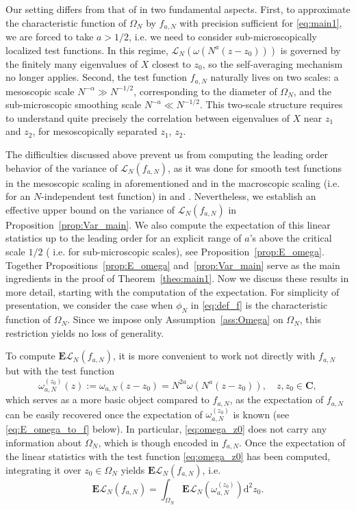 \documentclass[10pt]{amsart}
\numberwithin{equation}{section}
\newcommand{\dif}{\mathrm{d}}
\newcommand{\E}{\mathbf{E}}
\newcommand{\C}{\mathbf{C}}
\newcommand{\Lin}{\mathcal{L}}
\begin{document}
Our setting differs from that of \cite{Cipolloni_meso} in two fundamental aspects. First, to approximate the characteristic function of $\Omega_N$ by $f_{a,N}$ with precision sufficient for \eqref{eq:main1}, we are forced to take $a>1/2$, i.e. we need to consider sub-microscopically localized test functions. In this regime, $\Lin_N(\omega(N^a(z-z_0)))$ is governed by the finitely many eigenvalues of $X$ closest to $z_0$, so the self-averaging mechanism no longer applies. Second, the test function $f_{a,N}$ naturally lives on two scales: a mesoscopic scale $N^{-\alpha}\gg N^{-1/2}$, corresponding to the diameter of $\Omega_N$, and the sub-microscopic smoothing scale $N^{-a}\ll N^{-1/2}$. This two-scale structure requires to understand quite precisely the correlation between eigenvalues of $X$ near $z_1$ and $z_2$, for mesoscopically separated $z_1$, $z_2$.

The difficulties discussed above prevent us from computing the leading order behavior of the variance of $\Lin_N(f_{a,N})$, as it was done for smooth test functions in the mesoscopic scaling in aforementioned \cite[Theorem~2.1]{Cipolloni_meso} and in the macroscopic scaling (i.e. for an $N$-independent test function) in \cite[Theorem~2.2]{macroCLT_complex} and \cite[Theorem~2.2]{macroCLT_real}. Nevertheless, we establish an effective upper bound on the variance of $\Lin_N(f_{a,N})$ in Proposition~\ref{prop:Var_main}. We also compute the expectation of this linear statistics up to the leading order for an explicit range of $a$'s above the critical scale $1/2$ ( i.e. for sub-microscopic scales), see Proposition~\ref{prop:E_omega}. Together Propositions~\ref{prop:E_omega} and~\ref{prop:Var_main} serve as the main ingredients in the proof of Theorem~\ref{theo:main1}. Now we discuss these results in more detail, starting with the computation of the expectation. For simplicity of presentation, we consider the case when $\phi_N$ in \eqref{eq:def_f} is the characteristic function of $\Omega_N$. Since we impose only Assumption~\ref{ass:Omega} on $\Omega_N$, this restriction yields no loss of generality.

To compute $\E\Lin_N(f_{a,N})$, it is more convenient to work not directly with $f_{a,N}$ but with the test function
\begin{equation}
\omega_{a,N}^{(z_0)}(z):=\omega_{a,N}(z-z_0) = N^{2a}\omega(N^a(z-z_0)),\quad z,z_0\in\C,
\label{eq:omega_z0}
\end{equation}
which serves as a more basic object compared to $f_{a,N}$, as the expectation of $f_{a,N}$ can be easily recovered once the expectation of $\omega_{a,N}^{(z_0)}$ is known (see \eqref{eq:E_omega_to_f} below). In particular, \eqref{eq:omega_z0} does not carry any information about $\Omega_N$, which is though encoded in $f_{a,N}$. Once the expectation of the linear statistics with the test function \eqref{eq:omega_z0} has been computed, integrating it over $z_0\in\Omega_N$ yields $\E\Lin_N (f_{a,N})$, i.e.
\begin{equation}
\E \Lin_N (f_{a,N}) = \int_{\Omega_N} \E \Lin_N(\omega_{a,N}^{(z_0)})\dif^2 z_0.
\label{eq:E_omega_to_f}
\end{equation}
\end{document}
